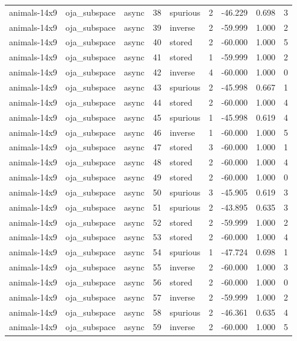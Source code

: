 \begin{tabular}{lllrlrrrr}
animals-14x9 & oja\_subspace & async & 38 & spurious & 2 & -46.229 & 0.698 & 3 \\
animals-14x9 & oja\_subspace & async & 39 & inverse & 2 & -59.999 & 1.000 & 2 \\
animals-14x9 & oja\_subspace & async & 40 & stored & 2 & -60.000 & 1.000 & 5 \\
animals-14x9 & oja\_subspace & async & 41 & stored & 1 & -59.999 & 1.000 & 2 \\
animals-14x9 & oja\_subspace & async & 42 & inverse & 4 & -60.000 & 1.000 & 0 \\
animals-14x9 & oja\_subspace & async & 43 & spurious & 2 & -45.998 & 0.667 & 1 \\
animals-14x9 & oja\_subspace & async & 44 & stored & 2 & -60.000 & 1.000 & 4 \\
animals-14x9 & oja\_subspace & async & 45 & spurious & 1 & -45.998 & 0.619 & 4 \\
animals-14x9 & oja\_subspace & async & 46 & inverse & 1 & -60.000 & 1.000 & 5 \\
animals-14x9 & oja\_subspace & async & 47 & stored & 3 & -60.000 & 1.000 & 1 \\
animals-14x9 & oja\_subspace & async & 48 & stored & 2 & -60.000 & 1.000 & 4 \\
animals-14x9 & oja\_subspace & async & 49 & stored & 2 & -60.000 & 1.000 & 0 \\
animals-14x9 & oja\_subspace & async & 50 & spurious & 3 & -45.905 & 0.619 & 3 \\
animals-14x9 & oja\_subspace & async & 51 & spurious & 2 & -43.895 & 0.635 & 3 \\
animals-14x9 & oja\_subspace & async & 52 & stored & 2 & -59.999 & 1.000 & 2 \\
animals-14x9 & oja\_subspace & async & 53 & stored & 2 & -60.000 & 1.000 & 4 \\
animals-14x9 & oja\_subspace & async & 54 & spurious & 1 & -47.724 & 0.698 & 1 \\
animals-14x9 & oja\_subspace & async & 55 & inverse & 2 & -60.000 & 1.000 & 3 \\
animals-14x9 & oja\_subspace & async & 56 & stored & 2 & -60.000 & 1.000 & 0 \\
animals-14x9 & oja\_subspace & async & 57 & inverse & 2 & -59.999 & 1.000 & 2 \\
animals-14x9 & oja\_subspace & async & 58 & spurious & 2 & -46.361 & 0.635 & 4 \\
animals-14x9 & oja\_subspace & async & 59 & inverse & 2 & -60.000 & 1.000 & 5 \\

\end{tabular}
